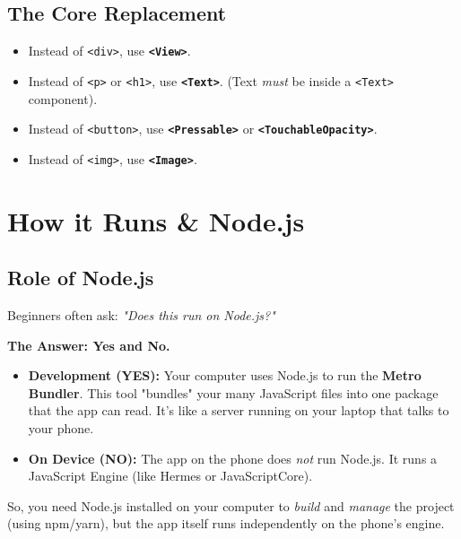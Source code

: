 \documentclass[11pt,a4paper,oneside]{book}
\begin{document}
\section{The Core Replacement}

\begin{itemize}
    \item Instead of \texttt{<div>}, use \textbf{\texttt{<View>}}.
    \item Instead of \texttt{<p>} or \texttt{<h1>}, use \textbf{\texttt{<Text>}}. (Text \textit{must} be inside a \texttt{<Text>} component).
    \item Instead of \texttt{<button>}, use \textbf{\texttt{<Pressable>}} or \textbf{\texttt{<TouchableOpacity>}}.
    \item Instead of \texttt{<img>}, use \textbf{\texttt{<Image>}}.
\end{itemize}

\chapter{How it Runs \& Node.js}

\section{Role of Node.js}

Beginners often ask: \textit{"Does this run on Node.js?"}

\begin{nodebox}
\textbf{The Answer: Yes and No.}

\begin{itemize}
    \item \textbf{Development (YES):} Your computer uses Node.js to run the \textbf{Metro Bundler}. This tool "bundles" your many JavaScript files into one package that the app can read. It's like a server running on your laptop that talks to your phone.
    \item \textbf{On Device (NO):} The app on the phone does \textit{not} run Node.js. It runs a JavaScript Engine (like Hermes or JavaScriptCore).
\end{itemize}
\end{nodebox}

So, you need Node.js installed on your computer to \textit{build} and \textit{manage} the project (using npm/yarn), but the app itself runs independently on the phone's engine.
\end{document}
